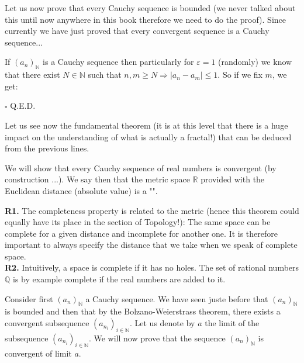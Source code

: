 	\begin{theorem}
	Let us now prove that every Cauchy sequence is bounded (we never talked about this until now anywhere in this book therefore we need to do the proof). Since currently we have just proved that every convergent sequence is a Cauchy sequence...
	\end{theorem}
	\begin{dem}
	If $(a_n)_\mathbb{N}$ is a Cauchy sequence then particularly for $\varepsilon=1$ (randomly) we know that there exist $N\in \mathbb{N}$ such that $n,m\geq N\Rightarrow |a_n-a_m|\leq 1$. So if we fix $m$, we get:
	
	\begin{flushright}
		$\square$  Q.E.D.
	\end{flushright}
	\end{dem}
	Let us see now the fundamental theorem (it is at this level that there is a huge impact on the understanding of what is actually a fractal!) that can be deduced from the previous  lines.
	\begin{theorem}
	We will show that every Cauchy sequence of real numbers is convergent (by construction ...). We say then that the metric space $\mathbb{R}$ provided with the Euclidean distance (absolute value) is a "\label{complete space cauchy sequence}".
	\end{theorem}
	\begin{tcolorbox}[title=Remarks,colframe=black,arc=10pt]
	\textbf{R1.} The completeness property is related to the metric (hence this theorem could equally have its place in the section of Topology!): The same space can be complete for a given distance and incomplete for another one. It is therefore important to always specify the distance that we take when we speak of complete space.\\
	
	\textbf{R2.} Intuitively, a space is complete if it has no holes. The set of rational numbers $\mathbb{Q}$ is by example complete if the real numbers are added to it.
	\end{tcolorbox}
	\begin{theorem}
	Consider first $(a_n)_\mathbb{N}$ a Cauchy sequence. We have seen juste before that  $(a_n)_\mathbb{N}$ is bounded and then that by the Bolzano-Weierstrass theorem, there exists a convergent subsequence  $(a_{n_i})_{i\in\mathbb{N}}$. Let us denote by $a$ the limit of the subsequence $(a_{n_i})_{i\in\mathbb{N}}$. We will now prove that the sequence $(a_n)_\mathbb{N}$ is convergent of limit $a$.
	\end{theorem}
	
